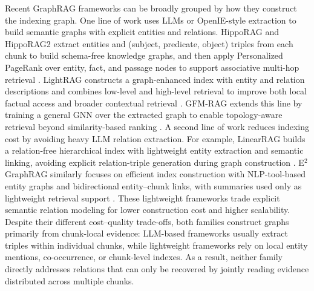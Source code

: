 \documentclass[11pt]{article}
\begin{document}
Recent GraphRAG frameworks can be broadly grouped by how they construct the indexing graph. One line of work uses LLMs or OpenIE-style extraction to build semantic graphs with explicit entities and relations. HippoRAG and HippoRAG2 extract entities and (subject, predicate, object) triples from each chunk to build schema-free knowledge graphs, and then apply Personalized PageRank over entity, fact, and passage nodes to support associative multi-hop retrieval \citep{gutierrez2024hipporag,gutierrez2025rag}. LightRAG constructs a graph-enhanced index with entity and relation descriptions and combines low-level and high-level retrieval to improve both local factual access and broader contextual retrieval \citep{guo2024lightrag}. GFM-RAG extends this line by training a general GNN over the extracted graph to enable topology-aware retrieval beyond similarity-based ranking \citep{luo2026gfm}. A second line of work reduces indexing cost by avoiding heavy LLM relation extraction. For example, LinearRAG builds a relation-free hierarchical index with lightweight entity extraction and semantic linking, avoiding explicit relation-triple generation during graph construction \citep{zhuang2025linearrag}. E$^2$GraphRAG similarly focuses on efficient index construction with NLP-tool-based entity graphs and bidirectional entity--chunk links, with summaries used only as lightweight retrieval support \citep{zhao20252graphrag}. These lightweight frameworks trade explicit semantic relation modeling for lower construction cost and higher scalability. Despite their different cost--quality trade-offs, both families construct graphs primarily from chunk-local evidence: LLM-based frameworks usually extract triples within individual chunks, while lightweight frameworks rely on local entity mentions, co-occurrence, or chunk-level indexes. As a result, neither family directly addresses relations that can only be recovered by jointly reading evidence distributed across multiple chunks.

\end{document}
